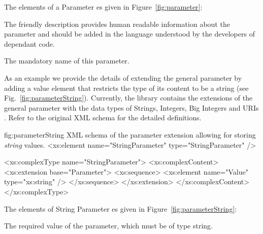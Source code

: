 \vspace{3pt}\noindent The elements of a Parameter es given in Figure~\ref{fig:parameter}:
\begin{parameter}
The friendly description provides human readable information about the parameter and should
be added in the language understood by the developers of dependant code.
\end{parameter}
\begin{parameter}
The mandatory name of this parameter.
\end{parameter}


As an example we provide the details of extending the general parameter by adding a value element that 
restricts the type of its content to be a string (see Fig.~\ref{fig:parameterString}).
%
Currently, the library contains the extensions of the general parameter  with the data types of 
Strings, Integers, Big Integers and 
URIs%
.
%
Refer to the original XML schema for the detailed definitions.


\begin{xml}
{fig:parameterString}
{XML schema of the parameter extension allowing for storing \emph{string} values.}
<xs:element name="StringParameter" type="StringParameter" />

<xs:complexType name="StringParameter">
  <xs:complexContent>
    <xs:extension base="Parameter">
      <xs:sequence>
        <xs:element name="Value" type="xs:string" />
      </xs:sequence>
    </xs:extension>
  </xs:complexContent>
</xs:complexType>
\end{xml}

\vspace{3pt}\noindent The elements of String Parameter es given in Figure~\ref{fig:parameterString}:
\begin{parameter}
The required value of the parameter, which must be of type string.
\end{parameter}


